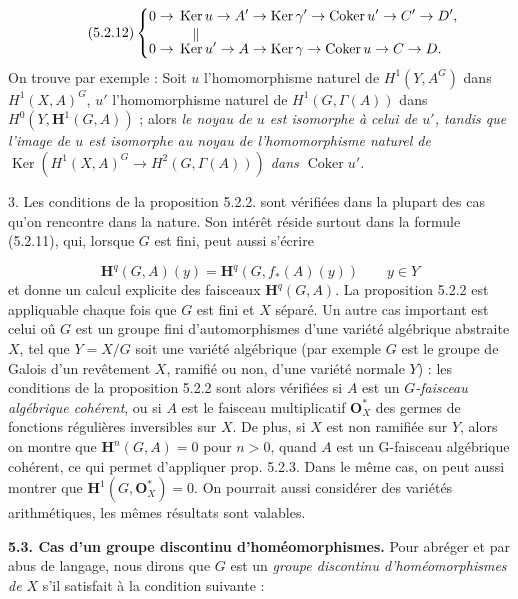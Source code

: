 \[
\tag{5.2.12}
\left\{
\begin{aligned}
0\to{}&\operatorname{Ker}u\to A'
\to\operatorname{Ker}\gamma'
\to\operatorname{Coker}u'\to C'\to D',\\[-0.2em]
&\hphantom{\operatorname{K}}\mathrel{\Vert}\\[-0.45em]
0\to{}&\operatorname{Ker}u'\to A
\to\operatorname{Ker}\gamma
\to\operatorname{Coker}u\to C\to D.
\end{aligned}
\right.
\]
On trouve par exemple : Soit $u$ l'homomorphisme naturel de $H^1(Y,A^G)$ dans
$H^1(X,A)^G$, $u'$ l'homomorphisme naturel de $H^1(G,\Gamma(A))$ dans
$H^0(Y,\mathbf H^1(G,A))$ ; alors \textit{le noyau de $u$ est isomorphe à
celui de $u'$, tandis que l'image de $u$ est isomorphe au noyau de
l'homomorphisme naturel de
$\operatorname{Ker}(H^1(X,A)^G\to H^2(G,\Gamma(A)))$ dans
$\operatorname{Coker}u'$.}

3. Les conditions de la proposition 5.2.2. sont vérifiées dans la
plupart des cas qu'on rencontre dans la nature. Son intérêt réside surtout
dans la formule (5.2.11), qui, lorsque $G$ est fini, peut aussi s'écrire

\[
\mathbf H^q(G,A)(y)=\mathbf H^q(G,f_*(A)(y))\qquad y\in Y
\tag{5.2.11 bis}
\]
et donne un calcul explicite des faisceaux $\mathbf H^q(G,A)$. La proposition
5.2.2 est appliquable chaque fois que $G$ est fini et $X$ séparé. Un autre cas
important est celui oû $G$ est un groupe fini d'automorphismes d'une variété
algébrique abstraite $X$, tel que $Y=X/G$ soit une variété algébrique (par
exemple $G$ est le groupe de Galois d'un revêtement $X$, ramifié ou non, d'une
variété normale $Y$) : les conditions de la proposition 5.2.2 sont alors
vérifiées si $A$ est un \textit{$G$-faisceau algébrique cohérent}, ou si $A$
est le faisceau multiplicatif $\mathbf O_X^*$ des germes de fonctions
régulières inversibles sur $X$. De plus, si $X$ est non ramifiée sur $Y$,
alors on montre que $\mathbf H^n(G,A)=0$ pour $n>0$, quand $A$ est un
G-faisceau algébrique cohérent, ce qui permet d'appliquer prop. 5.2.3. Dans
le même cas, on peut aussi montrer que $\mathbf H^1(G,\mathbf O_X^*)=0$. On
pourrait aussi considérer des variétés arithmétiques, les mêmes résultats sont
valables.

\bigskip
\textbf{5.3. Cas d'un groupe discontinu d'homéomorphismes.} Pour
abréger et par abus de langage, nous dirons que $G$ est un \textit{groupe
discontinu d'homéomorphismes de $X$} s'il satisfait à la condition suivante :

